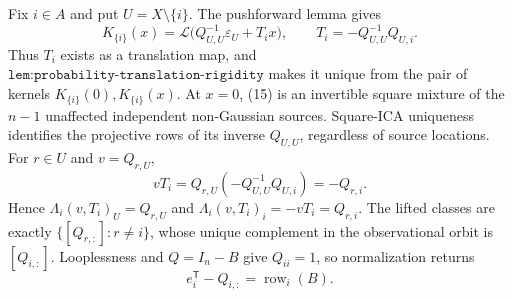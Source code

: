 Fix \(i\in A\) and put \(U=X\setminus\{i\}\). The pushforward lemma gives
\[
K_{\{i\}}(x)=\mathcal L\bigl(Q_{U,U}^{-1}\varepsilon_U+T_i x\bigr),
\qquad T_i=-Q_{U,U}^{-1}Q_{U,i}. \tag{15}
\]
Thus \(T_i\) exists as a translation map, and \(\texttt{lem:probability-translation-rigidity}\) makes it unique from the pair of kernels \(K_{\{i\}}(0),K_{\{i\}}(x)\). At \(x=0\), (15) is an invertible square mixture of the \(n-1\) unaffected independent non-Gaussian sources. Square-ICA uniqueness identifies the projective rows of its inverse \(Q_{U,U}\), regardless of source locations. For \(r\in U\) and \(v=Q_{r,U}\),
\[
vT_i=Q_{r,U}(-Q_{U,U}^{-1}Q_{U,i})=-Q_{r,i}.
\]
Hence \(\Lambda_i(v,T_i)_U=Q_{r,U}\) and \(\Lambda_i(v,T_i)_i=-vT_i=Q_{r,i}\). The lifted classes are exactly \(\{[Q_{r,:}]:r\ne i\}\), whose unique complement in the observational orbit is \([Q_{i,:}]\). Looplessness and \(Q=I_n-B\) give \(Q_{ii}=1\), so normalization returns
\[
e_i^{\mathsf T}-Q_{i,:}=\operatorname{row}_i(B). \tag{16}
\]

